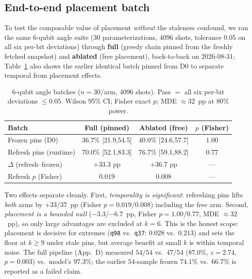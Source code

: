 \documentclass[journal,10pt,twocolumn]{IEEEtran}
\newcommand{\q}[1]{\texttt{q#1}}
\begin{document}
\subsection{End-to-end placement batch}
\label{sec:e2ebatch}
To test the composable value of placement \emph{without} the staleness confound, we ran the same 6-qubit angle suite
(30 parameterizations, 4096 shots, tolerance $0.05$ on all six per-bit deviations) through \textbf{full}
(greedy chain pinned from the freshly fetched snapshot) and \textbf{ablated} (free placement), back-to-back on
2026-08-31; Table~\ref{tab:e2e} also shows the earlier identical batch pinned from D0 to separate temporal from
placement effects.

\begin{table}[t]
\caption{6-qubit angle batches ($n{=}30$/arm, 4096 shots). Pass $=$ all six per-bit deviations $\le0.05$. Wilson
95\% CI; Fisher exact $p$; MDE $\approx32$~pp at $80\%$ power.}
\label{tab:e2e}
\centering
\footnotesize
\setlength{\tabcolsep}{4pt}
\begin{tabular}{@{}lccc@{}}
\toprule
Batch & Full (pinned) & Ablated (free) & $p$ (Fisher)\\
\midrule
Frozen pins (D0)  & $36.7\%$ [21.9,54.5] & $40.0\%$ [24.6,57.7] & $1.00$\\
Refresh pins (runtime) & $70.0\%$ [52.1,83.3] & $76.7\%$ [59.1,88.2] & $0.77$\\
\midrule
$\Delta$ (refresh--frozen) & $+33.3$ pp & $+36.7$ pp & ---\\
Refresh $p$ (Fisher) & $0.019$ & $0.008$ & ---\\
\bottomrule
\end{tabular}
\end{table}

Two effects separate cleanly. First, \emph{temporality is significant}: refreshing pins lifts \emph{both} arms by
$+33/37$~pp (Fisher $p{=}0.019$/$0.008$) including the free arm. Second, \emph{placement is a bounded null}
($-3.3$/$-6.7$~pp, Fisher $p{=}1.00$/$0.77$, MDE $\approx32$~pp), so only large advantages are excluded at $k{=}6$.
This is the honest scope: placement is decisive for extremes (\q{98} vs.\ \q{37}: $0.028$ vs.\ $0.213$) and sets the
floor at $k\ge9$ under stale pins, but average benefit at small $k$ is within temporal noise.
The full pipeline (App.~D) measured $54/54$ vs.\ $47/54$ ($87.0\%$, $z{=}2.74$, $p{=}0.003$) vs.\ model's $97.3\%$;
the earlier $54$-sample frozen $74.1\%$ vs.\ $66.7\%$ is reported as a failed claim.

\end{document}
